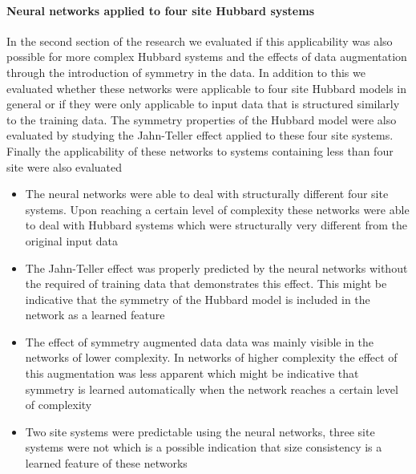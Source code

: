 \documentclass[12pt]{article}
\begin{document}
\paragraph{Neural networks applied to four site Hubbard systems}
In the second section of the research we evaluated if this applicability was also possible for more complex Hubbard systems and the effects of data augmentation through the introduction of symmetry in the data. In addition to this we evaluated whether these networks were applicable to four site Hubbard models in general or if they were only applicable to input data that is structured similarly to the training data. The symmetry properties of the Hubbard model were also evaluated by studying the Jahn-Teller effect applied to these four site systems. Finally the applicability of these networks to systems containing less than four site were also evaluated
\begin{itemize}
	\item The neural networks were able to deal with structurally different four site systems. Upon reaching a certain level of complexity these networks were able to deal with Hubbard systems which were structurally very different from the original input data
	\item The Jahn-Teller effect was properly predicted by the neural networks without the required of training data that demonstrates this effect. This might be indicative that the symmetry of the Hubbard model is included in the network as a learned feature
	\item The effect of symmetry augmented data data was mainly visible in the networks of lower complexity. In networks of higher complexity the effect of this augmentation was less apparent which might be indicative that symmetry is learned automatically when the network reaches a certain level of complexity
	\item Two site systems were predictable using the neural networks, three site systems were not which is a possible indication that size consistency is a learned feature of these networks  
\end{itemize} 

\newpage


\end{document}
